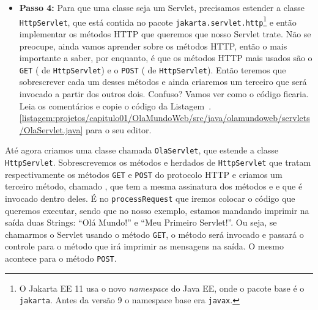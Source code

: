 \begin{itemize}
    
    \item \textbf{Passo 4:} Para que uma classe seja um Servlet, precisamos estender a classe \texttt{HttpServlet}, que está contida no pacote \texttt{jakarta.servlet.http}\footnote{O Jakarta EE 11 usa o novo \textit{namespace} do Java EE, onde o pacote base é o \texttt{jakarta}. Antes da versão 9 o namespace base era \texttt{javax}.} e então implementar os métodos HTTP que queremos que nosso Servlet trate. Não se preocupe, ainda vamos aprender sobre os métodos HTTP, então o mais importante a saber, por enquanto, é que os métodos HTTP mais usados são o \texttt{GET} ( de \texttt{HttpServlet}) e o  \texttt{POST} ( de  \texttt{HttpServlet}). Então teremos que sobrescrever cada um desses métodos e ainda criaremos um terceiro que será invocado a partir dos outros dois. Confuso? Vamos ver como o código ficaria. Leia os comentários e copie o código da Listagem~\thechapter.\ref{listagem:projetos/capitulo01/OlaMundoWeb/src/java/olamundoweb/servlets/OlaServlet.java} para o seu editor.
    
\end{itemize}

\FloatBarrier
{}
\FloatBarrier
    
Até agora criamos uma classe chamada \texttt{OlaServlet}, que estende a classe \texttt{HttpServlet}. Sobrescrevemos os métodos  e  herdados de \texttt{HttpServlet} que tratam respectivamente os métodos \texttt{GET} e \texttt{POST} do protocolo HTTP e criamos um terceiro método, chamado , que tem a mesma assinatura dos métodos  e  e que é invocado dentro deles. É no \texttt{processRequest} que iremos colocar o código que queremos executar, sendo que no nosso exemplo, estamos mandando imprimir na saída duas Strings: ``Olá Mundo!'' e ``Meu Primeiro Servlet!''. Ou seja, se chamarmos o Servlet usando o método \texttt{GET}, o método  será invocado e passará o controle para o método  que irá imprimir as mensagens na saída. O mesmo acontece para o método \texttt{POST}.

